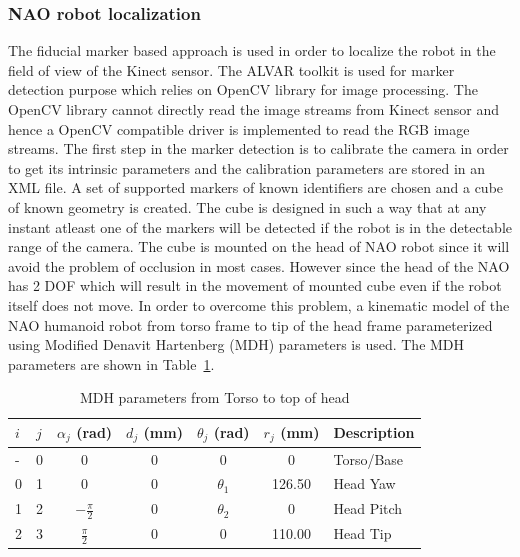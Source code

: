 \subsubsection{NAO robot localization}
The fiducial marker based approach is used in order to localize the robot in the field of view of the Kinect sensor. The ALVAR \cite{ALVAR} toolkit is used for marker detection purpose which relies on OpenCV library for image processing. The OpenCV library cannot directly read the image streams from Kinect sensor and hence a OpenCV compatible driver is implemented to read the RGB image streams. The first step in the marker detection is to calibrate the camera in order to get its intrinsic parameters and the calibration parameters are stored in an XML file. A set of supported markers of known identifiers are chosen and a cube of known geometry is created. The cube is designed in such a way that at any instant atleast one of the markers will be detected if the robot is in the detectable range of the camera. The cube is mounted on the head of NAO robot since it will avoid the problem of occlusion in most cases. However since the head of the NAO has 2 DOF which will result in the movement of mounted cube even if the robot itself does not move. In order to overcome this problem, a kinematic model of the NAO humanoid robot from torso frame to tip of the head frame parameterized using Modified Denavit Hartenberg (MDH) \cite{khalil2004modeling} parameters is used. The MDH parameters are shown in Table~\ref{table:nao_mdh}.
\begin{table}[H]
\centering
\small
\caption{MDH parameters from Torso to top of head}
\label{table:nao_mdh}
\begin{tabular}{|l|l|c|c|c|c|p{2cm}|}
\hline
  \textbf{$i$}  & \textbf{$j$}  & \textbf{$\alpha_j$ (rad)} & \textbf{$d_j$ (mm)} & \textbf{$\theta_j$ (rad)} & \textbf{$r_j$ (mm)} & \textbf{Description}
  \tabularnewline \hline
  - & 0 & 0 & 0 & 0 & 0 & Torso/Base
                                          \tabularnewline\hline
                                          
  0 & 1 & 0 & 0 & $\theta_1$ & 126.50 & Head Yaw
                                          \tabularnewline\hline
                       
  1 & 2 & $-\frac{\pi}{2}$ & 0 & $\theta_2$ & 0 & Head Pitch
                                          \tabularnewline\hline                    
  
  2 & 3 & $\frac{\pi}{2}$ & 0 & 0 & 110.00 & Head Tip
                                          \tabularnewline\hline
\end{tabular}
\end{table}

